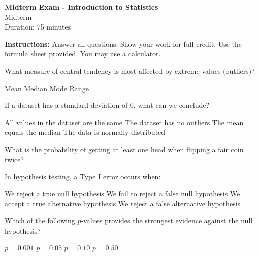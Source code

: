 \documentclass[11pt,letterpaper]{exam}
\begin{document}
\begin{center}
\LARGE \textbf{Midterm Exam - Introduction to Statistics} \\
\large Midterm \\
\normalsize Duration: 75 minutes
\end{center}

\noindent \textbf{Instructions:} Answer all questions. Show your work for full credit. Use the formula sheet provided. You may use a calculator.

\vspace{0.25in}

\begin{questions}

\question[5] What measure of central tendency is most affected by extreme values (outliers)?

\begin{choices}
  \choice Mean
  \choice Median
  \choice Mode
  \choice Range
\end{choices}


\question[5] If a dataset has a standard deviation of 0, what can we conclude?

\begin{choices}
  \choice All values in the dataset are the same
  \choice The dataset has no outliers
  \choice The mean equals the median
  \choice The data is normally distributed
\end{choices}


\question[8] What is the probability of getting at least one head when flipping a fair coin twice?

\begin{choices}
\end{choices}


\question[8] In hypothesis testing, a Type I error occurs when:

\begin{choices}
  \choice We reject a true null hypothesis
  \choice We fail to reject a false null hypothesis
  \choice We accept a true alternative hypothesis
  \choice We reject a false alternative hypothesis
\end{choices}


\question[5] Which of the following $p$-values provides the strongest evidence against the null hypothesis?

\begin{choices}
  \choice $p = 0.001$
  \choice $p = 0.05$
  \choice $p = 0.10$
  \choice $p = 0.50$
\end{choices}



\end{questions}
\end{document}
